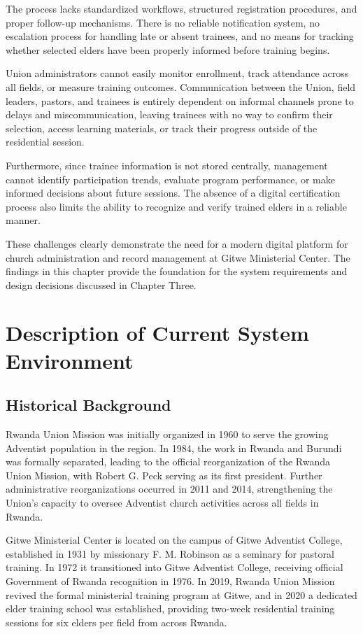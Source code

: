 \documentclass[12pt]{report}
\begin{document}
The process lacks standardized workflows, structured registration procedures, and proper follow-up mechanisms. There is no reliable notification system, no escalation process for handling late or absent trainees, and no means for tracking whether selected elders have been properly informed before training begins.

Union administrators cannot easily monitor enrollment, track attendance across all fields, or measure training outcomes. Communication between the Union, field leaders, pastors, and trainees is entirely dependent on informal channels prone to delays and miscommunication, leaving trainees with no way to confirm their selection, access learning materials, or track their progress outside of the residential session.

Furthermore, since trainee information is not stored centrally, management cannot identify participation trends, evaluate program performance, or make informed decisions about future sessions. The absence of a digital certification process also limits the ability to recognize and verify trained elders in a reliable manner.

These challenges clearly demonstrate the need for a modern digital platform for church administration and record management at Gitwe Ministerial Center. The findings in this chapter provide the foundation for the system requirements and design decisions discussed in Chapter Three.

\section{Description of Current System Environment}

\subsection{Historical Background}
Rwanda Union Mission was initially organized in 1960 to serve the growing Adventist population in the region. In 1984, the work in Rwanda and Burundi was formally separated, leading to the official reorganization of the Rwanda Union Mission, with Robert G. Peck serving as its first president. Further administrative reorganizations occurred in 2011 and 2014, strengthening the Union's capacity to oversee Adventist church activities across all fields in Rwanda.

Gitwe Ministerial Center is located on the campus of Gitwe Adventist College, established in 1931 by missionary F. M. Robinson as a seminary for pastoral training. In 1972 it transitioned into Gitwe Adventist College, receiving official Government of Rwanda recognition in 1976. In 2019, Rwanda Union Mission revived the formal ministerial training program at Gitwe, and in 2020 a dedicated elder training school was established, providing two-week residential training sessions for six elders per field from across Rwanda.
\end{document}
